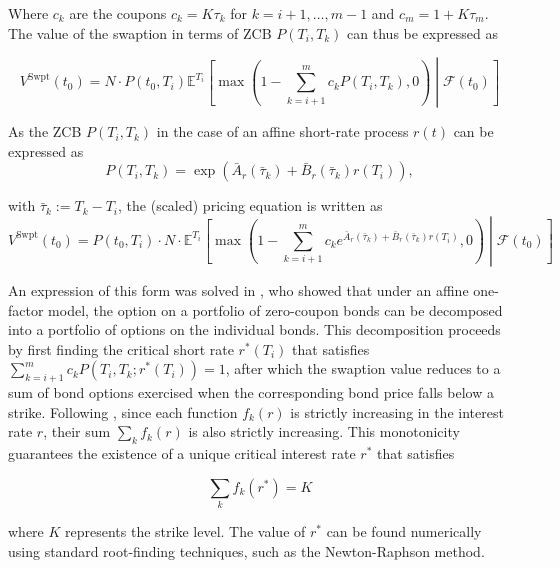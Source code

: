     \noindent
    Where $c_k$ are the coupons \( c_k = K \tau_k \) for \( k = i+1, \ldots, m-1 \) and \( c_m = 1 + K \tau_m \). The value of the swaption in terms of ZCB $P(T_i,T_k)$ can thus be expressed as 
    
    \begin{equation}
        V^{\text{Swpt}}(t_0) = N \cdot P(t_0, T_i) \mathbb{E}^{T_i} \left[ \max \left( 1 - \sum_{k=i+1}^m c_k P(T_i, T_k), 0 \right) \middle| \mathcal{F}(t_0) \right]
    \end{equation}

    \noindent
    As the ZCB \( P(T_i, T_k) \) in the case of an affine short-rate process \( r(t) \) can be expressed as
    \begin{equation}
        P(T_i, T_k) = \exp\left(\bar{A}_r(\bar{\tau}_k) + \bar{B}_r(\bar{\tau}_k)r(T_i)\right),
    \end{equation}

    \noindent
    with \( \bar{\tau}_k := T_k - T_i \), the (scaled) pricing equation is written as 
    \begin{equation}
        V^{\text{Swpt}}(t_0) = P(t_0, T_i) \cdot N \cdot \mathbb{E}^{T_i} \left[ \max\left(1 - \sum_{k=i+1}^m c_k e^{\bar{A}_r(\bar{\tau}_k) + \bar{B}_r(\bar{\tau}_k)r(T_i)}, 0\right) \middle| \mathcal{F}(t_0) \right]
    \end{equation}

    \noindent
    An expression of this form was solved in \cite{jamshidian1989exact}, who showed that under an affine one-factor model, the option on a portfolio of zero-coupon bonds can be decomposed into a portfolio of options on the individual bonds. This decomposition proceeds by first finding the critical short rate \( r^*(T_i) \) that satisfies \( \sum_{k=i+1}^m c_k P(T_i, T_k; r^*(T_i)) = 1 \), after which the swaption value reduces to a sum of bond options exercised when the corresponding bond price falls below a strike. Following \cite{oosterlee2019mathematical}, since each function \( f_k(r) \) is strictly increasing in the interest rate \( r \), their sum \( \sum_{k} f_k(r) \) is also strictly increasing. This monotonicity guarantees the existence of a unique critical interest rate \( r^* \) that satisfies
    
    \begin{equation}
        \sum_{k} f_k(r^*) = K
    \end{equation}   

    \noindent
    where \( K \) represents the strike level. The value of \( r^* \) can be found numerically using standard root-finding techniques, such as the Newton-Raphson method.

